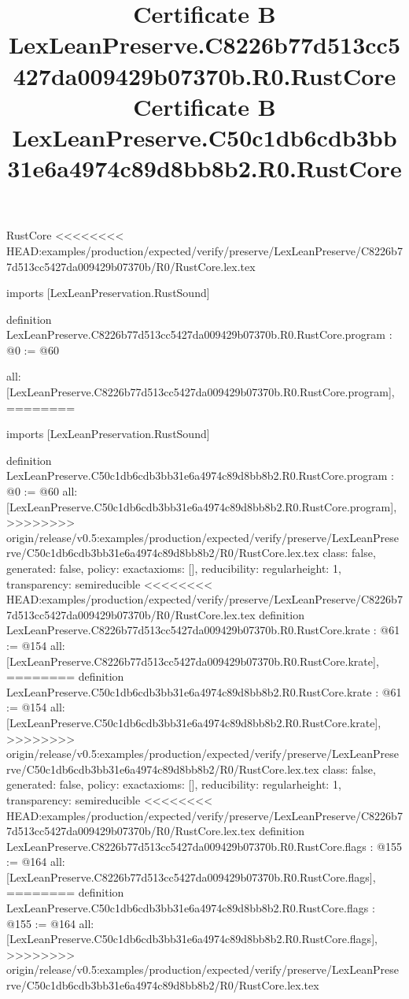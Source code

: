 \begin{lexlean}{RustCore}
<<<<<<<< HEAD:examples/production/expected/verify/preserve/LexLeanPreserve/C8226b77d513cc5427da009429b07370b/R0/RustCore.lex.tex
\title{Certificate B LexLeanPreserve.C8226b77d513cc5427da009429b07370b.R0.RustCore}
\begin{coremodule}
imports [LexLeanPreservation.RustSound]

definition LexLeanPreserve.C8226b77d513cc5427da009429b07370b.R0.RustCore.program : @0 := @60 {
  all: [LexLeanPreserve.C8226b77d513cc5427da009429b07370b.R0.RustCore.program],
========
\title{Certificate B LexLeanPreserve.C50c1db6cdb3bb31e6a4974c89d8bb8b2.R0.RustCore}
\begin{coremodule}
imports [LexLeanPreservation.RustSound]

definition LexLeanPreserve.C50c1db6cdb3bb31e6a4974c89d8bb8b2.R0.RustCore.program : @0 := @60 {
  all: [LexLeanPreserve.C50c1db6cdb3bb31e6a4974c89d8bb8b2.R0.RustCore.program],
>>>>>>>> origin/release/v0.5:examples/production/expected/verify/preserve/LexLeanPreserve/C50c1db6cdb3bb31e6a4974c89d8bb8b2/R0/RustCore.lex.tex
  class: false,
  generated: false,
  policy: exact{axioms: []},
  reducibility: regular{height: 1},
  transparency: semireducible
}
<<<<<<<< HEAD:examples/production/expected/verify/preserve/LexLeanPreserve/C8226b77d513cc5427da009429b07370b/R0/RustCore.lex.tex
definition LexLeanPreserve.C8226b77d513cc5427da009429b07370b.R0.RustCore.krate : @61 := @154 {
  all: [LexLeanPreserve.C8226b77d513cc5427da009429b07370b.R0.RustCore.krate],
========
definition LexLeanPreserve.C50c1db6cdb3bb31e6a4974c89d8bb8b2.R0.RustCore.krate : @61 := @154 {
  all: [LexLeanPreserve.C50c1db6cdb3bb31e6a4974c89d8bb8b2.R0.RustCore.krate],
>>>>>>>> origin/release/v0.5:examples/production/expected/verify/preserve/LexLeanPreserve/C50c1db6cdb3bb31e6a4974c89d8bb8b2/R0/RustCore.lex.tex
  class: false,
  generated: false,
  policy: exact{axioms: []},
  reducibility: regular{height: 1},
  transparency: semireducible
}
<<<<<<<< HEAD:examples/production/expected/verify/preserve/LexLeanPreserve/C8226b77d513cc5427da009429b07370b/R0/RustCore.lex.tex
definition LexLeanPreserve.C8226b77d513cc5427da009429b07370b.R0.RustCore.flags : @155 := @164 {
  all: [LexLeanPreserve.C8226b77d513cc5427da009429b07370b.R0.RustCore.flags],
========
definition LexLeanPreserve.C50c1db6cdb3bb31e6a4974c89d8bb8b2.R0.RustCore.flags : @155 := @164 {
  all: [LexLeanPreserve.C50c1db6cdb3bb31e6a4974c89d8bb8b2.R0.RustCore.flags],
>>>>>>>> origin/release/v0.5:examples/production/expected/verify/preserve/LexLeanPreserve/C50c1db6cdb3bb31e6a4974c89d8bb8b2/R0/RustCore.lex.tex
}}}
\end{coremodule}}
\end{coremodule}
\end{lexlean}
